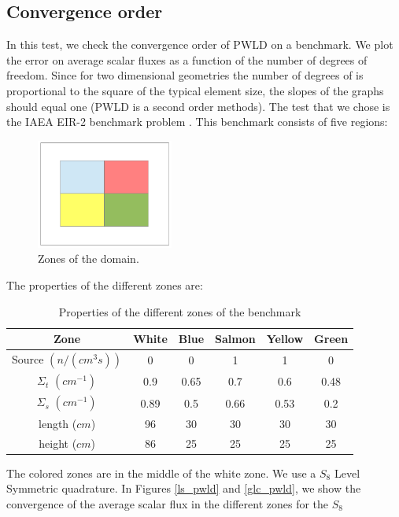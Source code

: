\subsection{Convergence order}
In this test, we check the convergence order of PWLD on a benchmark.
We plot the error on average scalar fluxes as a function of the number of 
degrees of freedom. Since for two dimensional geometries the number of degrees of is
proportional to the square of the typical element size, the slopes of the 
graphs should equal one (PWLD is a second order methods). The test
that we chose is the IAEA EIR-2 benchmark problem \cite{Khalil1985}. This 
benchmark consists of five regions:
\begin{figure}[H]
  \centering
  \includegraphics[width=0.4\textwidth]{./Janus/benchmark}
  \caption{Zones of the domain.}
\end{figure}
The properties of the different zones are:
\begin{table}[H]
  \begin{center}
    \caption{Properties of the different zones of the benchmark}
    \begin{tabular}{|c|c|c|c|c|c|}
      \hline
    Zone & White & Blue & Salmon & Yellow & Green \\
      \hline
      Source $(n/(cm^3s))$ & 0    & 0    & 1    & 1    & 0 \\
    $\Sigma_t$ $(cm^{-1})$ & 0.9  & 0.65 & 0.7  & 0.6  & 0.48 \\
    $\Sigma_s$ $(cm^{-1})$ & 0.89 & 0.5  & 0.66 & 0.53 & 0.2 \\
             length ($cm$) & 96   & 30   & 30   & 30   & 30 \\
             height ($cm$) & 86   & 25   & 25   & 25   & 25 \\
      \hline
    \end{tabular}
  \end{center}
\end{table}
The colored zones are in the middle of the white zone. We use a $S_8$ Level
Symmetric quadrature. In Figures \ref{ls_pwld} and \ref{glc_pwld}, we show the
convergence of the average scalar flux in the different zones for the $S_8$
